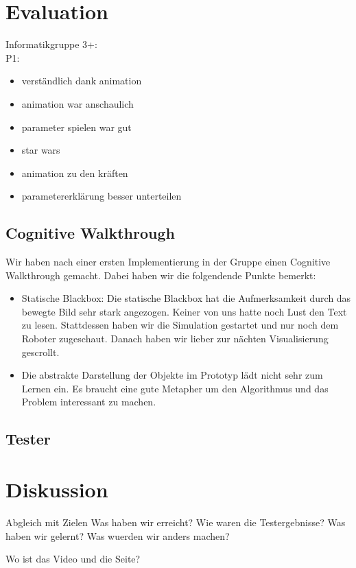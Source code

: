\section{Evaluation}
Informatikgruppe 3+: \\
P1:
\begin{itemize}
\item verständlich dank animation
\item animation war anschaulich
\item parameter spielen war gut
\item star wars
\item animation zu den kräften
\item parametererklärung besser unterteilen
\end{itemize}

\subsection{Cognitive Walkthrough}\label{sec:cogWal}
Wir haben nach einer ersten Implementierung in der Gruppe einen Cognitive Walkthrough gemacht. Dabei haben wir die folgendende Punkte bemerkt:
\begin{itemize}
	\item Statische Blackbox: Die statische Blackbox hat die Aufmerksamkeit durch das bewegte Bild sehr stark angezogen. Keiner von uns hatte noch Lust den Text zu lesen. Stattdessen haben wir die Simulation gestartet und nur noch dem Roboter zugeschaut. Danach haben wir lieber zur nächten Visualisierung gescrollt.
	\item Die abstrakte Darstellung der Objekte im Prototyp lädt nicht sehr zum Lernen ein. Es braucht eine gute Metapher um den Algorithmus und das Problem interessant zu machen.
\end{itemize}

\subsection{Tester}

\section{Diskussion}
Abgleich mit Zielen
Was haben wir erreicht?
Wie waren die Testergebnisse?
Was haben wir gelernt?
Was wuerden wir anders machen?

Wo ist das Video und die Seite?